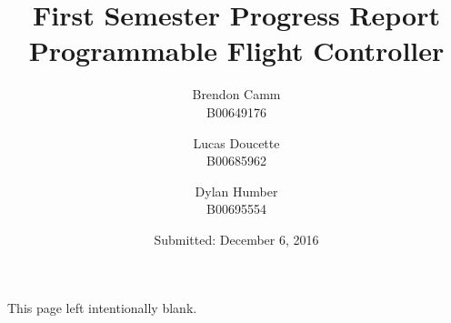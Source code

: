 \documentclass[12pt, twoside, letterpaper,titlepage]{article}
\title{First Semester Progress Report \\ Programmable Flight Controller}
\author{Brendon Camm \\ B00649176 \and Lucas Doucette \\ B00685962 \and Dylan Humber \\ B00695554}
\date{Submitted: December 6, 2016}
\begin{document}
	\maketitle
	\newpage
	\begin{center}
		This page left intentionally blank.
	\end{center}

	\newpage
	\begin{abstract} %
	\end{abstract}
	\setcounter{tocdepth}{2}
	\tableofcontents
	\pagebreak
	
	
	
	
	
	
	
	
	
	\newpage
	
	\appendix
	
	\newpage
	
	
	
	
\end{document}
